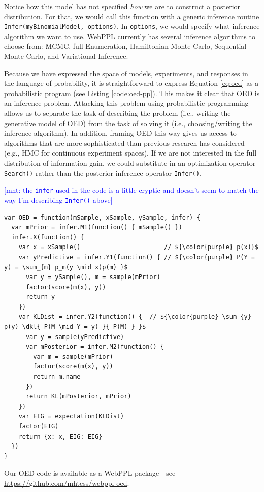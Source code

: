 \documentclass{article}
\newcommand{\dkl}{D_\mathrm{KL}\infdivx}
\newcommand{\mht}[1]{\textcolor{Blue}{[mht: #1]}}
\newcommand{\lou}[1]{\textcolor{orange}{[lou: #1]}}
\begin{document}
Notice how this model has not specified \emph{how} we are to construct a posterior distribution. For that, we would call this function with a generic inference routine \lstinline{Infer(myBinomialModel, options)}. In \lstinline{options}, we would specify what inference algorithm we want to use. WebPPL currently has several inference algorithms to choose from: MCMC, full Enumeration, Hamiltonian Monte Carlo, Sequential Monte Carlo, and Variational Inference.

Because we have expressed the space of models, experiments, and responses in the language of probability, it is straightforward to express Equation \ref{eq:oed} as a probabilistic program (see Listing \ref{code:oed-pp}).
This makes it clear that OED is an inference problem.
Attacking this problem using probabilistic programming allows us to separate the task of describing the problem (i.e., writing the generative model of OED) from the task of solving it (i.e., choosing/writing the inference algorithm).
In addition, framing OED this way gives us access to algorithms that are more sophisticated than previous research has considered  (e.g., HMC for continuous experiment spaces).
If we are not interested in the full distribution of information gain, we could substitute in an optimization operator \lstinline{Search()} rather than the posterior inference operator \lstinline{Infer()}.

\mht{the \lstinline{infer} used in the code is a little cryptic and doesn't seem to match the way I'm describing \lstinline{Infer()} above}
\begin{lstlisting}[mathescape, label={code:oed-pp}, caption = {OED implementation. For clarity, we have omitted some book-keeping details.}]
var OED = function(mSample, xSample, ySample, infer) {
  var mPrior = infer.M1(function() { mSample() })
  infer.X(function() {
    var x = xSample()                       // ${\color{purple} p(x)}$
    var yPredictive = infer.Y1(function() { // ${\color{purple} P(Y = y) = \sum_{m} p_m(y \mid x)p(m) }$
      var y = ySample(), m = sample(mPrior)
      factor(score(m(x), y))
      return y
    })
    var KLDist = infer.Y2(function() {  // ${\color{purple} \sum_{y} p(y) \dkl{ P(M \mid Y = y) }{ P(M) } }$
      var y = sample(yPredictive)
      var mPosterior = infer.M2(function() {
        var m = sample(mPrior)
        factor(score(m(x), y))
        return m.name
      })
      return KL(mPosterior, mPrior)
    })
    var EIG = expectation(KLDist)
    factor(EIG)
    return {x: x, EIG: EIG}
  })
}
\end{lstlisting}
Our OED code is available as a WebPPL package---see \url{https://github.com/mhtess/webppl-oed}.
\end{document}

